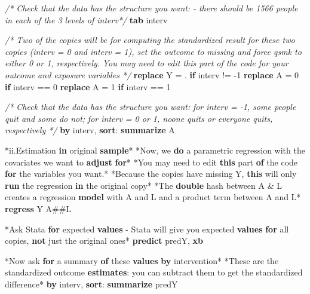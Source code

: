 \documentclass[
  10pt,
]{book}
\newenvironment{Shaded}{\begin{snugshade}}{\end{snugshade}}
\newcommand{\CommentTok}[1]{\textcolor[rgb]{0.56,0.35,0.01}{\textit{#1}}}
\newcommand{\FunctionTok}[1]{\textcolor[rgb]{0.00,0.00,0.00}{#1}}
\newcommand{\KeywordTok}[1]{\textcolor[rgb]{0.13,0.29,0.53}{\textbf{#1}}}
\newcommand{\NormalTok}[1]{#1}
\newcommand{\OtherTok}[1]{\textcolor[rgb]{0.56,0.35,0.01}{#1}}
\begin{document}
\begin{Shaded}
\begin{Highlighting}[]
\CommentTok{/* Check that the data has the structure you want: }
\CommentTok{ - there should be 1566 people in each of the 3 levels of interv*/}
\KeywordTok{tab}\NormalTok{ interv}

\CommentTok{/* Two of the copies will be for computing the standardized result}
\CommentTok{for these two copies (interv = 0 and interv = 1), set the outcome to}
\CommentTok{missing and force qsmk to either 0 or 1, respectively.}
\CommentTok{You may need to edit this part of the code for your outcome and exposure variables */}
\KeywordTok{replace}\NormalTok{ Y = . }\KeywordTok{if}\NormalTok{ interv != -1}
\KeywordTok{replace}\NormalTok{ A = 0 }\KeywordTok{if}\NormalTok{ interv == 0}
\KeywordTok{replace}\NormalTok{ A = 1 }\KeywordTok{if}\NormalTok{ interv == 1}

\CommentTok{/* Check that the data has the structure you want: }
\CommentTok{for interv = -1, some people quit and some do not; }
\CommentTok{for interv = 0 or 1, noone quits or everyone quits, respectively */}
\KeywordTok{by}\NormalTok{ interv, }\KeywordTok{sort}\NormalTok{: }\KeywordTok{summarize}\NormalTok{ A}

\NormalTok{*ii.Estimation }\KeywordTok{in}\NormalTok{ original }\KeywordTok{sample}\NormalTok{*}
\NormalTok{*Now, we }\KeywordTok{do}\NormalTok{ a parametric regression with the covariates we want to }\KeywordTok{adjust} \KeywordTok{for}\NormalTok{*}
\NormalTok{*You may need to edit }\KeywordTok{this}\NormalTok{ part }\KeywordTok{of}\NormalTok{ the code }\KeywordTok{for}\NormalTok{ the variables you want.*}
\NormalTok{*Because the copies have }\FunctionTok{missing}\NormalTok{ Y, }\KeywordTok{this}\NormalTok{ will only }\KeywordTok{run}\NormalTok{ the regression }\KeywordTok{in}\NormalTok{ the original copy*}
\NormalTok{*The }\KeywordTok{double}\NormalTok{ hash between A & L creates a regression }\KeywordTok{model}\NormalTok{ with A and L and a product term between A and L*}
\KeywordTok{regress}\NormalTok{ Y A##L}

\NormalTok{*Ask Stata }\KeywordTok{for}\NormalTok{ expected }\KeywordTok{values}\NormalTok{ - Stata will give you expected }\KeywordTok{values} \KeywordTok{for} \OtherTok{all}\NormalTok{ copies, }\KeywordTok{not}\NormalTok{ just the original ones*}
\KeywordTok{predict}\NormalTok{ predY, }\KeywordTok{xb}

\NormalTok{*Now ask }\KeywordTok{for}\NormalTok{ a summary }\KeywordTok{of}\NormalTok{ these }\KeywordTok{values} \KeywordTok{by}\NormalTok{ intervention*}
\NormalTok{*These are the standardized outcome }\KeywordTok{estimates}\NormalTok{: you can subtract them to }\FunctionTok{get}\NormalTok{ the standardized difference*}
\KeywordTok{by}\NormalTok{ interv, }\KeywordTok{sort}\NormalTok{: }\KeywordTok{summarize}\NormalTok{ predY}


\end{Highlighting}
\end{Shaded}
\end{document}
